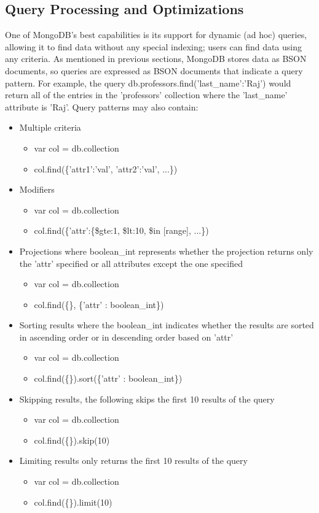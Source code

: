 \documentclass{dependencies/acm_proc_article-sp}
\begin{document}
\subsection{Query Processing and Optimizations}
One of MongoDB's best capabilities is its support for dynamic (ad hoc) queries, allowing it to find data without any special indexing; users can find data using any criteria.
As mentioned in previous sections, MongoDB stores data as BSON documents, so queries are expressed as BSON documents that indicate a query pattern.
For example, the query db.professors.find({'last\_name':'Raj'}) would return all of the entries in the 'professors' collection where the 'last\_name' attribute is 'Raj'.
Query patterns may also contain:
\begin{itemize}
\item Multiple criteria
 \begin{itemize}
  \item var col = db.collection
  \item col.find(\{'attr1':'val', 'attr2':'val', ...\})
 \end{itemize}
\item Modifiers
  \begin{itemize}
   \item var col = db.collection
   \item col.find(\{'attr':\{\$gte:1, \$lt:10, \$in [range], ...\})
  \end{itemize}
\item Projections where boolean\_int represents whether the projection returns only the 'attr' specified\cite{12} or all attributes except the one specified\cite{11}
  \begin{itemize}
    \item var col = db.collection
    \item col.find(\{\}, \{'attr' : boolean\_int\})
  \end{itemize}
\item Sorting results where the boolean\_int indicates whether the results are sorted in ascending order\cite{12} or in descending order\cite{11} based on 'attr'
  \begin{itemize}
    \item var col = db.collection
    \item col.find(\{\}).sort(\{'attr' : boolean\_int\})
  \end{itemize}
\item Skipping results, the following skips the first 10 results of the query
  \begin{itemize}
    \item var col = db.collection
    \item col.find(\{\}).skip(10)
  \end{itemize}
\item Limiting results only returns the first 10 results of the query
  \begin{itemize}
    \item var col = db.collection
    \item col.find(\{\}).limit(10)
  \end{itemize}
\end{itemize}
\end{document}

